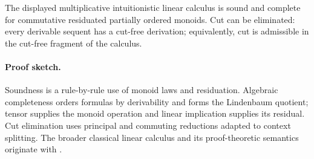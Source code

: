 \begin{theorem}
The displayed multiplicative intuitionistic linear calculus is sound and
complete for commutative residuated partially ordered monoids.  Cut can be
eliminated: every derivable sequent has a cut-free derivation;
equivalently, cut is admissible in the cut-free fragment of the calculus.
\end{theorem}

\paragraph{Proof sketch.}
Soundness is a rule-by-rule use of monoid laws and residuation.  Algebraic
completeness orders formulas by derivability and forms the Lindenbaum quotient;
tensor supplies the monoid operation and linear implication supplies its
residual.  Cut elimination uses principal and commuting reductions adapted to
context splitting.  The broader classical linear calculus and its
proof-theoretic semantics originate with \cite{Girard1987}.

